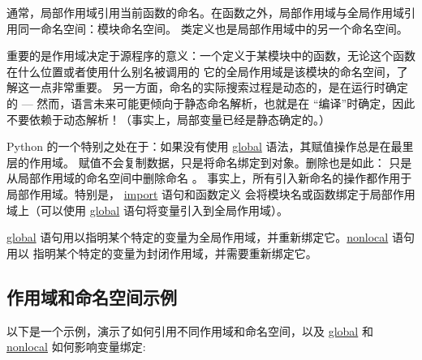 \documentclass[a4paper,10pt,english]{sphinxmanual}
\begin{document}
通常，局部作用域引用当前函数的命名。在函数之外，局部作用域与全局作用域引用同一命名空间：模块命名空间。
类定义也是局部作用域中的另一个命名空间。

重要的是作用域决定于源程序的意义：一个定义于某模块中的函数，无论这个函数在什么位置或者使用什么别名被调用的
它的全局作用域是该模块的命名空间，了解这一点非常重要。
另一方面，命名的实际搜索过程是动态的，是在运行时确定的 --- 然而，语言未来可能更倾向于静态命名解析，也就是在
“编译”时确定，因此不要依赖于动态解析！（事实上，局部变量已经是静态确定的。）

Python 的一个特别之处在于：如果没有使用 \href{https://docs.python.org/3/reference/simple\_stmts.html\#global}{global} 语法，其赋值操作总是在最里层的作用域。
赋值不会复制数据，只是将命名绑定到对象。删除也是如此： 只是从局部作用域的命名空间中删除命名  。
事实上，所有引入新命名的操作都作用于局部作用域。特别是， \href{https://docs.python.org/3/reference/simple\_stmts.html\#import}{import} 语句和函数定义
会将模块名或函数绑定于局部作用域上（可以使用 \href{https://docs.python.org/3/reference/simple\_stmts.html\#global}{global} 语句将变量引入到全局作用域）。

\href{https://docs.python.org/3/reference/simple\_stmts.html\#global}{global} 语句用以指明某个特定的变量为全局作用域，并重新绑定它。\href{https://docs.python.org/3/reference/simple\_stmts.html\#nonlocal}{nonlocal} 语句用以
指明某个特定的变量为封闭作用域，并需要重新绑定它。


\subsection{作用域和命名空间示例}
\label{classes:id4}\label{classes:tut-scopeexample}
以下是一个示例，演示了如何引用不同作用域和命名空间，以及 \href{https://docs.python.org/3/reference/simple\_stmts.html\#global}{global} 和 \href{https://docs.python.org/3/reference/simple\_stmts.html\#nonlocal}{nonlocal} 如何影响变量绑定:
\end{document}
